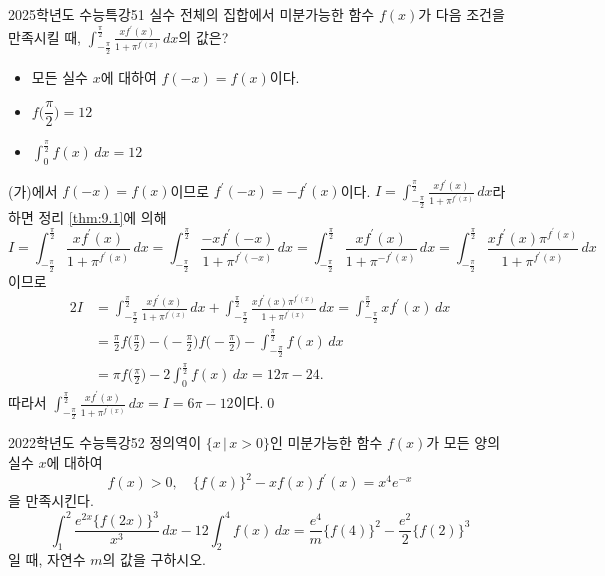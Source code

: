 \documentclass{article}
\begin{document}
\newpage
\begin{prob}{2025학년도 수능특강}{51}
	실수 전체의 집합에서 미분가능한 함수 $f(x)$가 다음 조건을 만족시킬 때, $\displaystyle\int_{-\tfrac{\pi}{2}}^{\tfrac{\pi}{2}}\frac{xf^{\prime}(x)}{1+\pi^{f^{\prime}(x)}}\,dx$의 값은?
	\begin{hint}
		\begin{itemize}
			\item[(가)] 모든 실수 $x$에 대하여 $f(-x)=f(x)$이다.
			\item[(나)] $f\biggl(\dfrac{\pi}{2}\biggr)=12$
			\item[(다)] $\displaystyle\int_0^{\tfrac{\pi}{2}}f(x)\,dx=12$
		\end{itemize}
	\end{hint}
\end{prob}

\begin{sol}
	(가)에서 $f(-x)=f(x)$이므로 $f^\prime(-x)=-f^\prime(x)$이다. $I=\displaystyle\int_{-\tfrac{\pi}{2}}^{\tfrac{\pi}{2}}\frac{xf^{\prime}(x)}{1+\pi^{f^{\prime}(x)}}\,dx$라 하면 정리 \ref{thm:9.1}에 의해
	\[
		I=\int_{-\tfrac{\pi}{2}}^{\tfrac{\pi}{2}}\frac{xf^{\prime}(x)}{1+\pi^{f^{\prime}(x)}}\,dx=\int_{-\tfrac{\pi}{2}}^{\tfrac{\pi}{2}}\frac{-xf^{\prime}(-x)}{1+\pi^{f^{\prime}(-x)}}\,dx=\int_{-\tfrac{\pi}{2}}^{\tfrac{\pi}{2}}\frac{xf^{\prime}(x)}{1+\pi^{-f^{\prime}(x)}}\,dx=\int_{-\tfrac{\pi}{2}}^{\tfrac{\pi}{2}}\frac{xf^{\prime}(x)\pi^{f^{\prime}(x)}}{1+\pi^{f^{\prime}(x)}}\,dx
	\]
	이므로
	\[
		\begin{aligned}
			2I&=\int_{-\tfrac{\pi}{2}}^{\tfrac{\pi}{2}}\frac{xf^{\prime}(x)}{1+\pi^{f^{\prime}(x)}}\,dx+\int_{-\tfrac{\pi}{2}}^{\tfrac{\pi}{2}}\frac{xf^{\prime}(x)\pi^{f^{\prime}(x)}}{1+\pi^{f^{\prime}(x)}}\,dx=\int_{-\tfrac{\pi}{2}}^{\tfrac{\pi}{2}}xf^{\prime}(x)\,dx\\[3pt]
			&=\frac{\pi}{2}f\biggl(\frac{\pi}{2}\biggr)-\biggl(-\frac{\pi}{2}\biggr)f\biggl(-\frac{\pi}{2}\biggr)-\int_{-\tfrac{\pi}{2}}^{\tfrac{\pi}{2}}f(x)\,dx\\[3pt]
			&=\pi f\biggl(\frac{\pi}{2}\biggr)-2\int_0^{\tfrac{\pi}{2}}f(x)\,dx=12\pi-24.
		\end{aligned}
	\]
	따라서 $\displaystyle\int_{-\tfrac{\pi}{2}}^{\tfrac{\pi}{2}}\frac{xf^{\prime}(x)}{1+\pi^{f^{\prime}(x)}}\,dx=I=6\pi-12$이다.\qed
\end{sol}

\newpage
\begin{prob}{2022학년도 수능특강}{52}
	정의역이 $\{x\,\vert\,x>0\}$인 미분가능한 함수 $f(x)$가 모든 양의 실수 $x$에 대하여
	\[
		f(x)>0,\quad\{f(x)\}^2-xf(x)f^{\prime}(x)=x^4e^{-x}
	\]
	을 만족시킨다.
	\[
		\int_1^2\frac{e^{2x}\{f(2x)\}^3}{x^3}\,dx-12\int_2^4f(x)\,dx=\frac{e^4}{m}\{f(4)\}^2-\frac{e^2}{2}\{f(2)\}^3
	\]
	일 때, 자연수 $m$의 값을 구하시오.
\end{prob}
\end{document}

